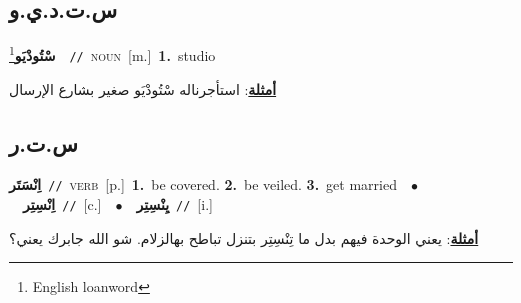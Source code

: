 \documentclass[10pt,a4paper,twoside]{article} %
\begin{document}
\begin{multicols}{2}
\vspace{-3mm}
\subsection*{\color{blue}\foreignlanguage{arabic}{س.ت.د.ي.و}\color{blue}{ (ntws)}} 

{\setlength\topsep{0pt}\textbf{\foreignlanguage{arabic}{سْتُودْيَو}}\footnote{English loanword}\ \ {\color{gray}\texttt{//}\color{black}}\ \textsc{noun}\ [m.]\ \textbf{1.}~studio\  \begin{flushright}\color{gray}\foreignlanguage{arabic}{\textbf{\underline{\foreignlanguage{arabic}{أمثلة}}}: استأجرناله سْتُودْيَو صغير بشارع الإرسال}\end{flushright}\color{black}} \vspace{2mm}

\vspace{-3mm}
\subsection*{\color{blue}\foreignlanguage{arabic}{س.ت.ر}\color{blue}{}} 

{\setlength\topsep{0pt}\textbf{\foreignlanguage{arabic}{اِنْسَتَر}}\ {\color{gray}\texttt{//}\color{black}}\ \textsc{verb}\ [p.]\ \textbf{1.}~be covered.  \textbf{2.}~be veiled.  \textbf{3.}~get married\ \ $\bullet$\ \ \setlength\topsep{0pt}\textbf{\foreignlanguage{arabic}{اِنْسِتِر}}\ {\color{gray}\texttt{//}\color{black}}\ [c.]\ \ $\bullet$\ \ \setlength\topsep{0pt}\textbf{\foreignlanguage{arabic}{يِنْسِتِر}}\ {\color{gray}\texttt{//}\color{black}}\ [i.]\  \begin{flushright}\color{gray}\foreignlanguage{arabic}{\textbf{\underline{\foreignlanguage{arabic}{أمثلة}}}: يعني الوحدة فيهم بدل ما تِنْسِتِر بتنزل تباطح بهالزلام. شو الله جابرك يعني؟}\end{flushright}\color{black}} \vspace{2mm}


\end{multicols}
\end{document}
